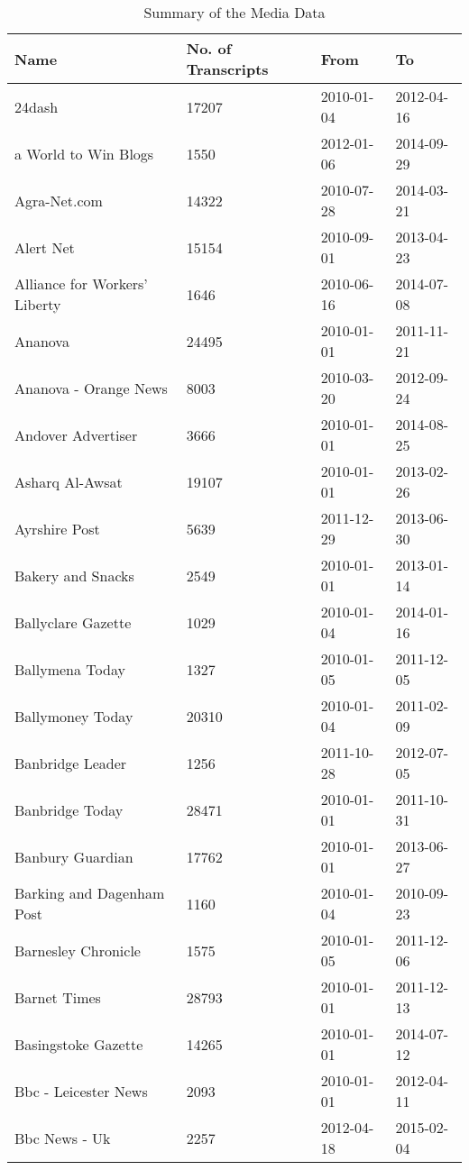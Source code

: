 \begingroup\tiny
\begin{longtable}{p{}p{}p{}p{}}
\caption{Summary of the Media Data} \\ 
  \hline
Name & No. of Transcripts & From & To \\ 
  \hline
24dash & 17207 & 2010-01-04 & 2012-04-16 \\ 
  a World to Win Blogs & 1550 & 2012-01-06 & 2014-09-29 \\ 
  Agra-Net.com & 14322 & 2010-07-28 & 2014-03-21 \\ 
  Alert Net & 15154 & 2010-09-01 & 2013-04-23 \\ 
  Alliance for Workers' Liberty & 1646 & 2010-06-16 & 2014-07-08 \\ 
  Ananova & 24495 & 2010-01-01 & 2011-11-21 \\ 
  Ananova - Orange News & 8003 & 2010-03-20 & 2012-09-24 \\ 
  Andover Advertiser & 3666 & 2010-01-01 & 2014-08-25 \\ 
  Asharq Al-Awsat & 19107 & 2010-01-01 & 2013-02-26 \\ 
  Ayrshire Post & 5639 & 2011-12-29 & 2013-06-30 \\ 
  Bakery and Snacks & 2549 & 2010-01-01 & 2013-01-14 \\ 
  Ballyclare Gazette & 1029 & 2010-01-04 & 2014-01-16 \\ 
  Ballymena Today & 1327 & 2010-01-05 & 2011-12-05 \\ 
  Ballymoney Today & 20310 & 2010-01-04 & 2011-02-09 \\ 
  Banbridge Leader & 1256 & 2011-10-28 & 2012-07-05 \\ 
  Banbridge Today & 28471 & 2010-01-01 & 2011-10-31 \\ 
  Banbury Guardian & 17762 & 2010-01-01 & 2013-06-27 \\ 
  Barking and Dagenham Post & 1160 & 2010-01-04 & 2010-09-23 \\ 
  Barnesley Chronicle & 1575 & 2010-01-05 & 2011-12-06 \\ 
  Barnet Times & 28793 & 2010-01-01 & 2011-12-13 \\ 
  Basingstoke Gazette & 14265 & 2010-01-01 & 2014-07-12 \\ 
  Bbc - Leicester News & 2093 & 2010-01-01 & 2012-04-11 \\ 
  Bbc News - Uk & 2257 & 2012-04-18 & 2015-02-04 \\ 

\end{longtable}
